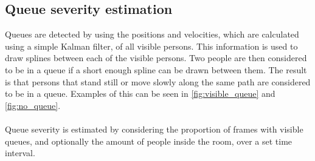\newpage

\subsection{Queue severity estimation}
Queues are detected by using the positions and velocities, which are calculated using a simple Kalman filter, of all visible persons. This information is used to draw splines between each of the visible persons. Two people are then considered to be in a queue if a short enough spline can be drawn between them. The result is that persons that stand still or move slowly along the same path are considered to be in a queue. Examples of this can be seen in \ref{fig:visible_queue} and \ref{fig:no_queue}.
\\ \\
Queue severity is estimated by considering the proportion of frames with visible queues, and optionally the amount of people inside the room, over a set time interval. 
